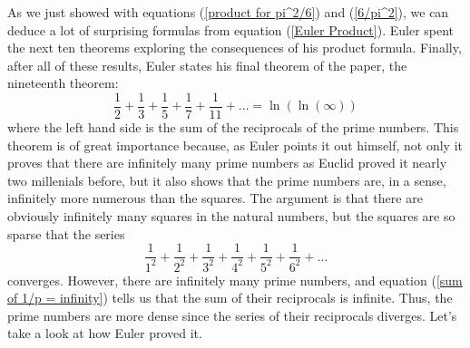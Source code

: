 As we just showed with equations (\ref{product for pi^2/6}) and (\ref{6/pi^2}), we can deduce a lot of surprising formulas from equation (\ref{Euler Product}). Euler spent the next ten theorems exploring the consequences of his product formula. Finally, after all of these results, Euler states his final theorem of the paper, the nineteenth theorem: 
\begin{equation} \label{sum of 1/p = infinity}
    \boxed{\frac{1}{2} + \frac{1}{3} + \frac{1}{5} + \frac{1}{7} + \frac{1}{11} + \dots = \ln(\ln(\infty))}
\end{equation}
where the left hand side is the sum of the reciprocals of the prime numbers. This theorem is of great importance because, as Euler points it out himself, not only it proves that there are infinitely many prime numbers as Euclid proved it nearly two millenials before, but it also shows that the prime numbers are, in a sense, infinitely more numerous than the squares. The argument is that there are obviously infinitely many squares in the natural numbers, but the squares are so sparse that the series
$$\frac{1}{1^2} + \frac{1}{2^2} + \frac{1}{3^2} + \frac{1}{4^2} + \frac{1}{5^2} + \frac{1}{6^2} + \dots$$
converges. However, there are infinitely many prime numbers, and equation (\ref*{sum of 1/p = infinity}) tells us that the sum of their reciprocals is infinite. Thus, the prime numbers are more dense since the series of their reciprocals diverges. Let's take a look at how Euler proved it.

